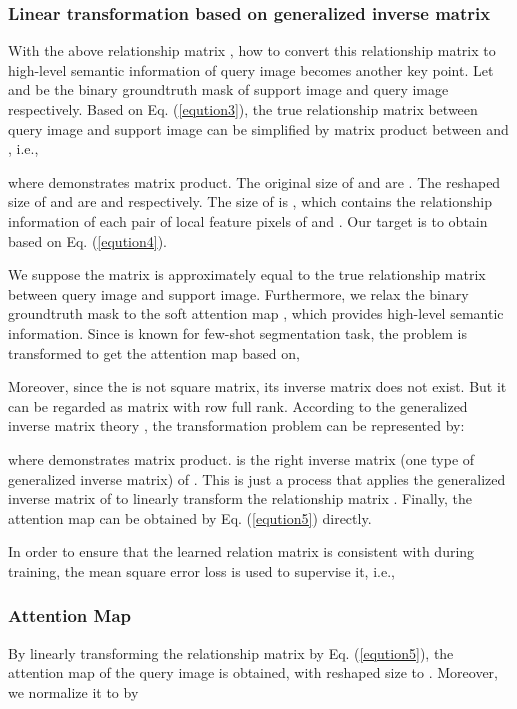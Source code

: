 \documentclass[runningheads]{llncs}
\begin{document}
\subsubsection{Linear transformation based on generalized inverse matrix}
With the above relationship matrix , how to convert this relationship matrix  to high-level semantic information of query image becomes another key point. 
Let  and  be the binary groundtruth mask of support image and query image respectively. Based on Eq. (\ref{eqution3}), the true relationship matrix  between query image and support image can be simplified by matrix product between  and , i.e.,

where  demonstrates matrix product. The original size of  and  are . The reshaped size of  and  are  and  respectively. The size of  is , which contains the relationship information of each pair of local feature pixels of  and . Our target is to obtain  based on Eq. (\ref{eqution4}).

We suppose the matrix  is approximately equal to the true relationship matrix  between query image and support image. Furthermore, we relax the binary groundtruth mask  to the soft attention map , which provides high-level semantic information. Since  is known for few-shot segmentation task, the problem is transformed to get the attention map  based on, 


Moreover, since the  is not square matrix, its inverse matrix does not exist. But it can be regarded as matrix with row full rank. According to the generalized inverse matrix theory \cite{ref_inverse}, the transformation problem can be represented by:

where  demonstrates matrix product.  is the right inverse matrix (one type of generalized inverse matrix) of . This is just a process that applies the generalized inverse matrix of  to linearly transform the relationship matrix . Finally, the attention map can be obtained by Eq. (\ref{eqution5}) directly.


In order to ensure that the learned relation matrix  is consistent with  during training, the mean square error loss is used to supervise it, i.e., 



\subsubsection{Attention Map}
By linearly transforming the relationship matrix  by Eq. (\ref{eqution5}), the attention map of the query image  is obtained, with reshaped size to . Moreover, we normalize it to  by
\end{document}
